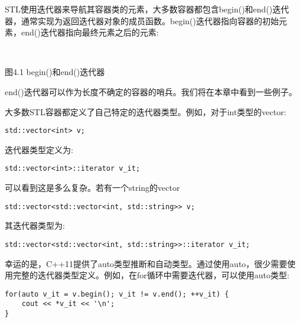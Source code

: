 

STL使用迭代器来导航其容器类的元素，大多数容器都包含begin()和end()迭代器，通常实现为返回迭代器对象的成员函数。begin()迭代器指向容器的初始元素，end()迭代器指向最终元素之后的元素:

\hspace*{\fill} \\ %
\begin{center}

图4.1  begin()和end()迭代器
\end{center}

end()迭代器可以作为长度不确定的容器的哨兵。我们将在本章中看到一些例子。

大多数STL容器都定义了自己特定的迭代器类型。例如，对于int类型的vector:

\begin{lstlisting}[style=styleCXX]
std::vector<int> v;
\end{lstlisting}

迭代器类型定义为:

\begin{lstlisting}[style=styleCXX]
std::vector<int>::iterator v_it;
\end{lstlisting}

可以看到这是多么复杂。若有一个string的vector

\begin{lstlisting}[style=styleCXX]
std::vector<std::vector<int, std::string>> v;
\end{lstlisting}

其迭代器类型为:

\begin{lstlisting}[style=styleCXX]
std::vector<std::vector<int, std::string>>::iterator v_it;
\end{lstlisting}

幸运的是，C++11提供了auto类型推断和自动类型。通过使用auto，很少需要使用完整的迭代器类型定义。例如，在for循环中需要迭代器，可以使用auto类型:

\begin{lstlisting}[style=styleCXX]
for(auto v_it = v.begin(); v_it != v.end(); ++v_it) {
	cout << *v_it << '\n';
}
\end{lstlisting}

